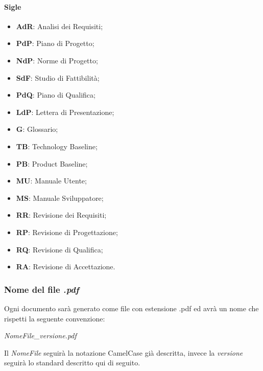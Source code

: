 	\paragraph{Sigle}
	\begin{itemize}
		\item \textbf{AdR}: Analisi dei Requisiti;
		\item \textbf{PdP}: Piano di Progetto;
		\item \textbf{NdP}: Norme di Progetto;
		\item \textbf{SdF}: Studio di Fattibilità;
		\item \textbf{PdQ}: Piano di Qualifica;
		\item \textbf{LdP}: Lettera di Presentazione;
		\item \textbf{G}: Glossario;
		\item \textbf{TB}: Technology Baseline;
		\item \textbf{PB}: Product Baseline;
		\item \textbf{MU}: Manuale Utente;
		\item \textbf{MS}: Manuale Sviluppatore;
		\item \textbf{RR}: Revisione dei Requisiti;
		\item \textbf{RP}: Revisione di Progettazione;
		\item \textbf{RQ}: Revisione di Qualifica;
		\item \textbf{RA}: Revisione di Accettazione.
	\end{itemize}

\begin{comment}
	\subsubsection{Componenti grafiche}
	\textcolor{red}{Da controllare, quando inizieremo ad usarle}
	\begin{itemize}
		\item Tabelle
		\item Immagini
	\end{itemize}
\end{comment}
	\subsubsection{Nome del file \emph{.pdf}}
	Ogni documento sarà generato come file con estensione .pdf ed avrà un nome che rispetti la seguente convenzione:
	\begin{center}
		\emph{NomeFile\_versione.pdf}
	\end{center}
	Il \emph{NomeFile} seguirà la notazione CamelCase già descritta, invece la \emph{versione} seguirà lo standard descritto qui di seguito.
	
